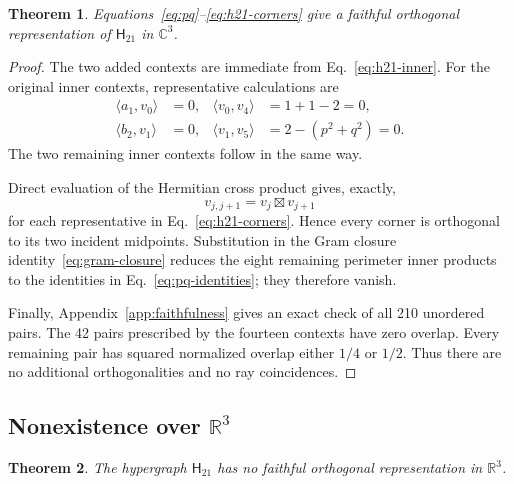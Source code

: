 \documentclass[twocolumn,aps,pra,floatfix,amsmath,amssymb,longbibliography]{revtex4-2}
\newtheorem{theorem}{Theorem}
\theoremstyle{definition}
\theoremstyle{remark}
\newcommand{\C}{\mathbb C}
\newcommand{\R}{\mathbb R}
\newcommand{\Htwentyone}{\mathsf H_{21}}
\begin{document}
\begin{theorem}
\label{thm:h21-complex}
Equations~\eqref{eq:pq}--\eqref{eq:h21-corners} give a faithful
orthogonal representation of $\Htwentyone$ in $\C^3$.
\end{theorem}

\begin{proof}
The two added contexts are immediate from Eq.~\eqref{eq:h21-inner}.
For the original inner contexts, representative calculations are
\begin{align*}
 \langle a_1,v_0\rangle&=0,&
 \langle v_0,v_4\rangle&=1+1-2=0,\\
 \langle b_2,v_1\rangle&=0,&
 \langle v_1,v_5\rangle&=2-(p^2+q^2)=0.
\end{align*}
The two remaining inner contexts follow in the same way.

Direct evaluation of the Hermitian cross product gives, exactly,
\[
 v_{j,j+1}=v_j\boxtimes v_{j+1}
\]
for each representative in Eq.~\eqref{eq:h21-corners}.  Hence every
corner is orthogonal to its two incident midpoints.  Substitution in the
Gram closure identity~\eqref{eq:gram-closure} reduces the eight remaining
perimeter inner products to the identities in
Eq.~\eqref{eq:pq-identities}; they therefore vanish.

Finally, Appendix~\ref{app:faithfulness} gives an exact check of all 210
unordered pairs.  The 42 pairs prescribed by the fourteen contexts have
zero overlap.  Every remaining pair has squared normalized overlap
either $1/4$ or $1/2$.  Thus there are no additional orthogonalities and
no ray coincidences.
\end{proof}

\subsection{Nonexistence over \texorpdfstring{$\R^3$}{R3}}

\begin{theorem}
\label{thm:h21-real}
The hypergraph $\Htwentyone$ has no faithful orthogonal representation
in $\R^3$.
\end{theorem}
\end{document}
